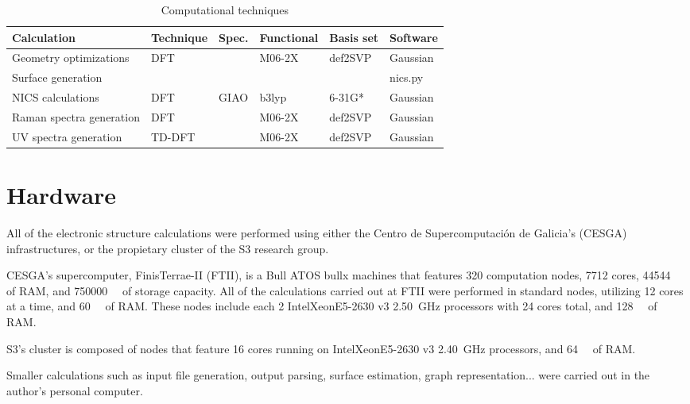 \begin{table*}[h]
    \centering
    \caption{Computational techniques}
    \begin{tabular}{@{}llllll@{}}
        \toprule
        Calculation & Technique & Spec. & Functional & Basis set & Software \\
        \midrule
        Geometry optimizations & DFT & & M06-2X & def2SVP & Gaussian \\
        Surface generation & & & & & nics.py \\
        NICS calculations & DFT & GIAO & b3lyp & 6-31G* & Gaussian \\
        Raman spectra generation & DFT & & M06-2X & def2SVP & Gaussian \\
        UV spectra generation & TD-DFT & & M06-2X & def2SVP & Gaussian \\
        \bottomrule
    \end{tabular}
\end{table*}


\section{Hardware}
All of the electronic structure calculations were performed using either the Centro de Supercomputación de Galicia's (CESGA) infrastructures, or the propietary cluster of the S3 research group.

CESGA's supercomputer, FinisTerrae-II (FTII), is a Bull ATOS bullx machines that features \num{320} computation nodes, \num{7712} cores, \SI{44544}{\giga\byte} of RAM, and \SI{750000}{\giga\byte} of storage capacity.
All of the calculations carried out at FTII were performed in standard nodes, utilizing \num{12} cores at a time, and \SI{60}{\giga\byte} of RAM.
These nodes include each 2 Intel\textregistered Xeon\textregistered E5-2630 v3 \SI{2.50}{\giga\hertz} processors with \num{24} cores total, and \SI{128}{\giga\byte} of RAM.

S3's cluster is composed of nodes that feature \num{16} cores running on Intel\textregistered Xeon\textregistered E5-2630 v3 \SI{2.40}{\giga\hertz} processors, and \SI{64}{\giga\byte} of RAM.

Smaller calculations such as input file generation, output parsing, surface estimation, graph representation... were carried out in the author's personal computer.
